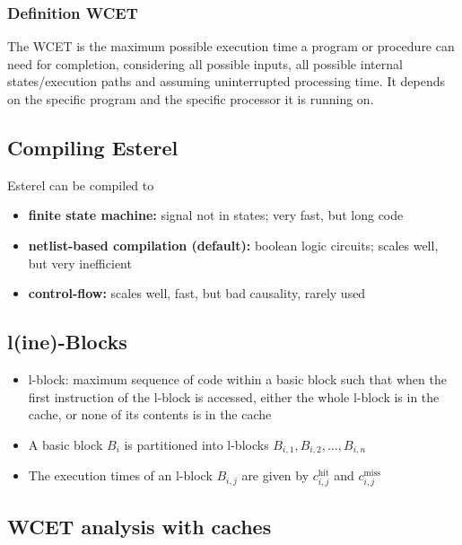\documentclass[fs, footer]{latex4ei}
\begin{document}
\begin{multicols*}{4}
{\subsubsection{Definition WCET}
The WCET is the maximum possible execution time a program or procedure can need for completion, considering all possible inputs, all possible internal states/execution paths and assuming uninterrupted processing time. It depends on the specific program and the specific processor it is running on.

\subsection{Compiling Esterel}
Esterel can be compiled to
\begin{itemize}
\item \textbf{finite state machine:} signal not in states; very fast, but long code
\item \textbf{netlist-based compilation (default):} boolean logic circuits; scales well, but very inefficient
\item \textbf{control-flow:} scales well, fast, but bad causality, rarely used
\end{itemize}

\subsection{l(ine)-Blocks}
\begin{itemize}
\item l-block: maximum sequence of code within a basic block such that when the first instruction of the l-block is accessed, either the whole l-block is in the cache, or none of its contents is in the cache
\item A basic block $B_i$ is partitioned into l-blocks $B_{i,1}, B_{i,2},\ldots, B_{i,n}$
\item The execution times of an l-block $B_{i,j}$ are given by $c^\text{hit}_{i,j}$ and $c^\text{miss}_{i,j}$
\end{itemize}

\subsection{WCET analysis with caches}

}
\end{multicols*}
\end{document}
